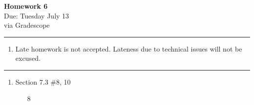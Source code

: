 \documentclass[12pt]{article}
\newif\ifshow
\begin{document}
\begin{center}
\ifshow
  \textbf{\Large Homework 2 Solution}\\
\else
  \textbf{\Large Homework 6}\\
\fi
Due: Tuesday July 13\\via Gradescope\\
\end{center}

\hrule

\vspace{0.2cm}

\begin{enumerate}[$\bullet$]  
\item Late homework is not accepted.  Lateness due to technical issues will not be excused.  
\end{enumerate}

\hrule

\vspace{0.5cm}



\begin{enumerate}

\item Section 7.3 \#8, 10
    \begin{enumerate}
        \item[8]
    \end{enumerate}


\end{enumerate}
\end{document}
